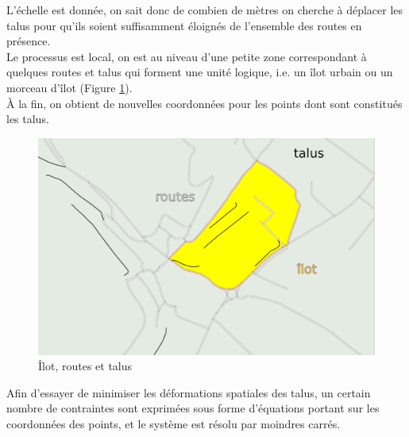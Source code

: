 \documentclass[11pt]{article}
\begin{document}
L'échelle est donnée, on sait donc de combien de mètres on cherche à déplacer les talus pour qu'ils soient suffisamment éloignés de l'ensemble des routes en présence.\\
Le processus est local, on est au niveau d'une petite zone correspondant à quelques routes et talus qui forment une unité logique, i.e. un îlot urbain ou un morceau d'îlot (Figure \ref{ilot_talus_routes}).\\
À la fin, on obtient de nouvelles coordonnées pour les points dont sont constitués les talus.\\
\begin{figure}[htp]
	\centering
	\includegraphics[scale=0.45]{ilot_talus_routes.pdf}
	\caption{Îlot, routes et talus}
	\label{ilot_talus_routes}
\end{figure}


Afin d'essayer de minimiser les déformations spatiales des talus, un certain nombre de contraintes sont exprimées sous forme d'équations portant sur les coordonnées des points, et le système est résolu par moindres carrés.
\end{document}

